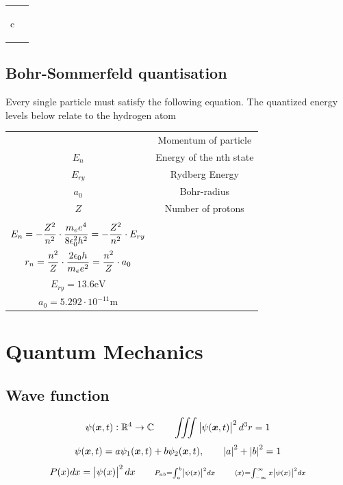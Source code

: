 \documentclass[a4paper, 9pt]{extarticle}
\begin{document}
\begin{twocolumn}
\begin{tabular}{cc}
\begin{mtabular}{c}
	\end{mtabular}
\end{tabular}

\subsection{Bohr-Sommerfeld quantisation}

Every single particle must satisfy the following equation. The quantized energy levels below relate to the hydrogen atom

\begin{tabular}{cc}
	\begin{dtabular}
		$p$ & Momentum of particle \\
		$E_n$ & Energy of the nth state \\
		$E_{ry}$ & Rydberg Energy \\
		$a_0$ & Bohr-radius \\
		$Z$ & Number of protons \\	
	\end{dtabular} &
	\begin{mtabular}{c}
		$\fmm \int_{length} p \cdot ds = n \cdot h \qquad n \in \mathbb{N}$ \\
		$\displaystyle E_n = -\frac{Z^2}{n^2} \cdot \frac{m_e e^4}{8 \epsilon_0^2 h^2} = - \frac{Z^2}{n^2} \cdot E_{ry} $ \\
		$\displaystyle r_n = \frac{n^2}{Z} \cdot \frac{2 \epsilon_0 h}{m_e e^2} = \frac{n^2}{Z} \cdot a_0$ \\
		$E_{ry} = 13.6 \si{\electronvolt}$ \\
		$a_0 = 5.292 \cdot 10^{-11} \si{\meter}$
	\end{mtabular}
\end{tabular}

\section{Quantum Mechanics}

\subsection{Wave function}
$$\psi(\bm{x}, t): \mathbb{R}^4 \rightarrow \mathbb{C} \qquad \iiint \left| \psi(\bm{x},t) \right|^2 d^3r = 1 $$
$$\psi(\bm{x}, t) = a \psi_1(\bm{x},t) + b \psi_2(\bm{x}, t), \qquad \left| a \right|^2 + \left| b \right|^2 = 1$$
$$P(x)dx=\left| \psi (x) \right|^2dx \qquad \scriptstyle{P_{ab}=\int_{a}^{b}\left| \psi (x) \right|^2dx \qquad \langle x\rangle=\int_{-\infty}^{\infty}x\left| \psi (x) \right|^2dx}$$


\end{twocolumn}
\end{document}
